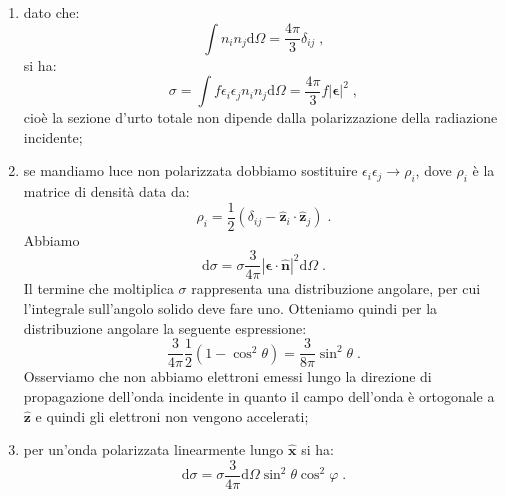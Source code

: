 \documentclass[12pt,a4paper]{report}
\theoremstyle{definition}
\numberwithin{equation}{section}
\newcommand{\diff}[1][]{\mathrm{d}#1}
\begin{document}
\begin{enumerate}
\item dato che:
\begin{equation}
\int n_in_j\diff{\Omega}=\frac{4\pi}{3}\delta_{ij}\;,
\end{equation}
si ha:
\begin{equation}
\sigma=\int f\epsilon_i\epsilon_jn_in_j\diff{\Omega}=\frac{4\pi}{3}f|\boldsymbol{\epsilon}|^2\;,
\end{equation}
cioè la sezione d'urto totale non dipende dalla polarizzazione della radiazione incidente;
\item se mandiamo luce non polarizzata dobbiamo sostituire $\epsilon_i\epsilon_j\rightarrow \rho_i$, dove $\rho_i$ è la matrice di densità data da:
\begin{equation}
\rho_i=\frac{1}{2}(\delta_{ij}-\hat{\mathbf{z}}_i\cdot\hat{\mathbf{z}}_j)\;.
\end{equation}
Abbiamo
\begin{equation}
\diff{\sigma}=\sigma \frac{3}{4\pi}|\boldsymbol{\epsilon}\cdot\hat{\mathbf{n}}|^2\diff{\Omega}\;.
\end{equation}
Il termine che moltiplica $\sigma$ rappresenta una distribuzione angolare, per cui l'integrale sull'angolo solido deve fare uno. Otteniamo quindi per la distribuzione angolare la seguente espressione:
\begin{equation}
\frac{3}{4\pi}\frac{1}{2}(1-\cos^2\theta)=\frac{3}{8\pi}\sin^2\theta\;.
\end{equation}
Osserviamo che non abbiamo elettroni emessi lungo la direzione di propagazione dell'onda incidente in quanto il campo dell'onda è ortogonale a $\hat{\mathbf{z}}$ e quindi gli elettroni non vengono accelerati;
\item per un'onda polarizzata linearmente lungo $\hat{\mathbf{x}}$ si ha:
\begin{equation}
\diff{\sigma}=\sigma \frac{3}{4\pi}\diff{\Omega}\sin^2\theta\cos^2\varphi\;.
\end{equation}
\end{enumerate}
\end{document}
